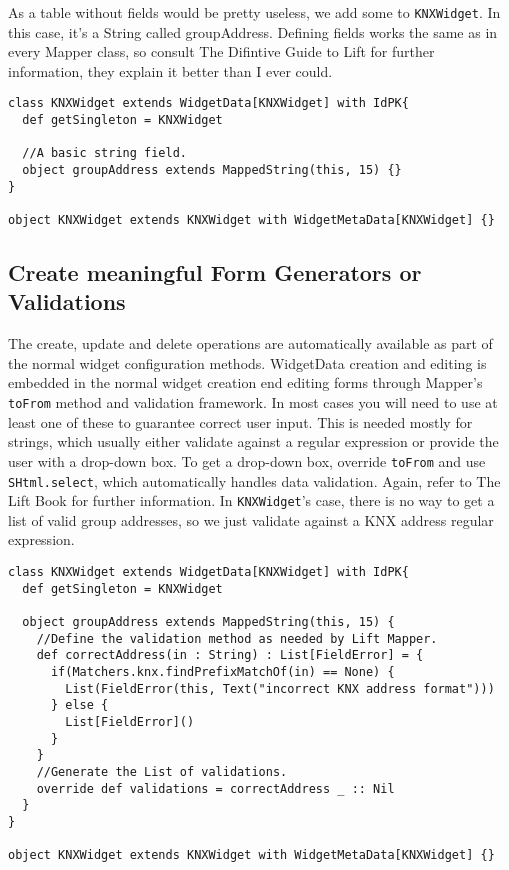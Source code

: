 As a table without fields would be pretty useless, we add some to \lstinline!KNXWidget!. In this case, it's a String called groupAddress. Defining fields works the same as in every Mapper class, so consult The Difintive Guide to Lift\cite[chapter 6: The Mapper and Record Frameworks]{becker:09} for further information, they explain it better than I ever could.

\begin{lstlisting}
class KNXWidget extends WidgetData[KNXWidget] with IdPK{
  def getSingleton = KNXWidget

  //A basic string field.
  object groupAddress extends MappedString(this, 15) {}
}

object KNXWidget extends KNXWidget with WidgetMetaData[KNXWidget] {}
\end{lstlisting}


\subsection{Create meaningful Form Generators or Validations}

The create, update and delete operations are automatically available as part of the normal widget configuration methods. WidgetData creation and editing is embedded in the normal widget creation end editing forms through Mapper's \lstinline!toFrom! method and validation framework. In most cases you will need to use at least one of these to guarantee correct user input. This is needed mostly for strings, which usually either validate against a regular expression or provide the user with a drop-down box. To get a drop-down box, override \lstinline!toFrom! and use \lstinline!SHtml.select!, which automatically handles data validation. Again, refer to The Lift Book\cite[as above]{becker:09} for further information. In \lstinline!KNXWidget!'s case, there is no way to get a list of valid group addresses, so we just validate against a KNX address regular expression.

\begin{lstlisting}
class KNXWidget extends WidgetData[KNXWidget] with IdPK{
  def getSingleton = KNXWidget

  object groupAddress extends MappedString(this, 15) {
    //Define the validation method as needed by Lift Mapper.
    def correctAddress(in : String) : List[FieldError] = {
      if(Matchers.knx.findPrefixMatchOf(in) == None) {
        List(FieldError(this, Text("incorrect KNX address format")))
      } else {
        List[FieldError]()
      }
    }
    //Generate the List of validations.
    override def validations = correctAddress _ :: Nil
  }
}

object KNXWidget extends KNXWidget with WidgetMetaData[KNXWidget] {}
\end{lstlisting}


